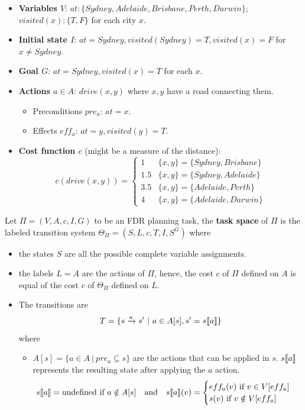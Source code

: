 \documentclass[10pt, letterpaper]{report}
\begin{document}
\begin{itemize}
    \item \textbf{Variables $V$}: $at : \{Sydney, Adelaide, Brisbane, Perth, Darwin\}$; $visited(x) : \{T, F\}$ for each city $x$.
    \item \textbf{Initial state $I$}: $at = Sydney, visited(Sydney) = T, visited(x) = F$ for $x \neq Sydney$.
    \item \textbf{Goal $G$}: $at = Sydney, visited(x) = T$ for each $x$.
    \item \textbf{Actions $a \in A$}: $drive(x, y)$ where $x, y$ have a road connecting them.
    \begin{itemize}
        \item Preconditions $pre_a$: $at = x$.
        \item Effects $eff_a$: $at = y, visited(y) = T$.
    \end{itemize}
    \item \textbf{Cost function $c$} (might be a measure of the distance): 
    \[
    c(drive(x, y)) = 
    \begin{cases} 
    1 & \{x, y\} = \{Sydney, Brisbane\} \\
    1.5 & \{x, y\} = \{Sydney, Adelaide\} \\
    3.5 & \{x, y\} = \{Adelaide, Perth\} \\
    4 & \{x, y\} = \{Adelaide, Darwin\} 
    \end{cases}
    \]
\end{itemize}
\begin{definition}
    Let $\Pi=(V,A,c,I,G)$ to be an FDR planning task, the \textbf{task space} of $\Pi$ is the labeled transition system $\Theta_\Pi=(S,L,c,T,I,S^G)$ where\begin{itemize}
        \item the states $S$ are all the possible complete variable assignments.
        \item the labels $L=A$ are the actions of $\Pi$, hence, the cost $c$ of $\Pi$ defined on $A$ is equal of the cost $c$ of $\Theta_\Pi$ defined on $L$.
        \item The transitions are\begin{equation}
            T=\{
                s\xrightarrow{a}s' \ | \ a\in A[s], s'= s\llbracket a \rrbracket
            \}
        \end{equation}
        where\begin{itemize}
            \item $A[s]=\{a\in A \ | \ pre_a\subseteq s\}$ are the actions that can be applied in $s$.
            $s\llbracket a \rrbracket$  represents the resulting state after applying the $a$ action.
            $$
            s\quadBrack{a}=\text{undefined} \text{ if }a\notin A[s]
            \ \ \text{ and } \ \ 
            s\quadBrack{a}(v)=\begin{cases}
                eff_a(v) \text{ if }v\in V[eff_a]\\ 
                s(v) \text{ if }v\notin  V[eff_a]
            \end{cases}$$
        \end{itemize}
    \end{itemize}
\end{definition}
\end{document}
